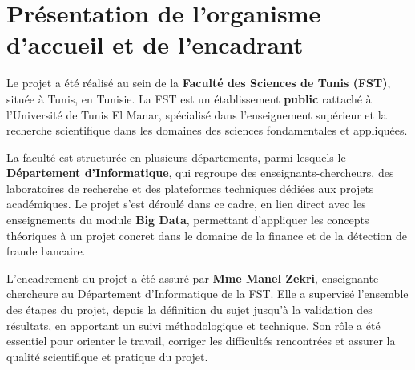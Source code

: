 \documentclass[12pt,a4paper]{article}
\begin{document}
\section*{Présentation de l’organisme d’accueil et de l’encadrant}

Le projet a été réalisé au sein de la \textbf{Faculté des Sciences de Tunis (FST)}, située à Tunis, en Tunisie. La FST est un établissement \textbf{public} rattaché à l’Université de Tunis El Manar, spécialisé dans l’enseignement supérieur et la recherche scientifique dans les domaines des sciences fondamentales et appliquées.

La faculté est structurée en plusieurs départements, parmi lesquels le \textbf{Département d’Informatique}, qui regroupe des enseignants-chercheurs, des laboratoires de recherche et des plateformes techniques dédiées aux projets académiques. Le projet s’est déroulé dans ce cadre, en lien direct avec les enseignements du module \textbf{Big Data}, permettant d’appliquer les concepts théoriques à un projet concret dans le domaine de la finance et de la détection de fraude bancaire.

L’encadrement du projet a été assuré par \textbf{Mme Manel Zekri}, enseignante-chercheure au Département d’Informatique de la FST. Elle a supervisé l’ensemble des étapes du projet, depuis la définition du sujet jusqu’à la validation des résultats, en apportant un suivi méthodologique et technique. Son rôle a été essentiel pour orienter le travail, corriger les difficultés rencontrées et assurer la qualité scientifique et pratique du projet.
\end{document}
